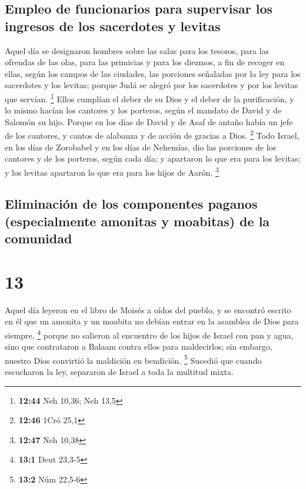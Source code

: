 \hypertarget{empleo-de-funcionarios-para-supervisar-los-ingresos-de-los-sacerdotes-y-levitas}{%
\subsection{Empleo de funcionarios para supervisar los ingresos de los
sacerdotes y
levitas}\label{empleo-de-funcionarios-para-supervisar-los-ingresos-de-los-sacerdotes-y-levitas}}

 Aquel día se designaron hombres sobre las salas para los
tesoros, para las ofrendas de las olas, para las primicias y para los
diezmos, a fin de recoger en ellas, según los campos de las ciudades,
las porciones señaladas por la ley para los sacerdotes y los levitas;
porque Judá se alegró por los sacerdotes y por los levitas que servían.
\footnote{\textbf{12:44} Neh 10,36; Neh 13,5}  Ellos
cumplían el deber de su Dios y el deber de la purificación, y lo mismo
hacían los cantores y los porteros, según el mandato de David y de
Salomón su hijo.  Porque en los días de David y de Asaf
de antaño había un jefe de los cantores, y cantos de alabanza y de
acción de gracias a Dios. \footnote{\textbf{12:46} 1Cró 25,1}
 Todo Israel, en los días de Zorobabel y en los días de
Nehemías, dio las porciones de los cantores y de los porteros, según
cada día; y apartaron lo que era para los levitas; y los levitas
apartaron lo que era para los hijos de Aarón. \footnote{\textbf{12:47}
  Neh 10,38}

\hypertarget{eliminaciuxf3n-de-los-componentes-paganos-especialmente-amonitas-y-moabitas-de-la-comunidad}{%
\subsection{Eliminación de los componentes paganos (especialmente
amonitas y moabitas) de la
comunidad}\label{eliminaciuxf3n-de-los-componentes-paganos-especialmente-amonitas-y-moabitas-de-la-comunidad}}

\hypertarget{section-12}{%
\section{13}\label{section-12}}

 Aquel día leyeron en el libro de Moisés a oídos del
pueblo, y se encontró escrito en él que un amonita y un moabita no
debían entrar en la asamblea de Dios para siempre, \footnote{\textbf{13:1}
  Deut 23,3-5}  porque no salieron al encuentro de los
hijos de Israel con pan y agua, sino que contrataron a Balaam contra
ellos para maldecirlos; sin embargo, nuestro Dios convirtió la maldición
en bendición. \footnote{\textbf{13:2} Núm 22,5-6}  Sucedió
que cuando escucharon la ley, separaron de Israel a toda la multitud
mixta.

